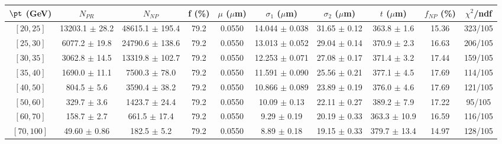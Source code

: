 \begin{tabular}{c||c|c|c|c|c|c|c||c|c}
$\pt$ (GeV) & $N_{PR}$ & $N_{NP}$ & f (\%) & $\mu$ ($\mu$m) & $\sigma_1$ ($\mu$m) & $\sigma_2$ ($\mu$m)  & $t$ ($\mu$m) & $f_{NP}$ (\%) & $\chi^2$/ndf \\
\hline
$[20, 25]$ & 13203.1 $\pm$ 28.2 & 48615.1 $\pm$ 195.4 & 79.2 & 0.0550 & 14.044 $\pm$ 0.038 & 31.65 $\pm$ 0.12 & 363.8 $\pm$ 1.6 & 15.36 & 323/105\\
$[25, 30]$ & 6077.2 $\pm$ 19.8 & 24790.6 $\pm$ 138.6 & 79.2 & 0.0550 & 13.013 $\pm$ 0.052 & 29.04 $\pm$ 0.14 & 370.9 $\pm$ 2.3 & 16.63 & 206/105\\
$[30, 35]$ & 3062.8 $\pm$ 14.5 & 13319.8 $\pm$ 102.7 & 79.2 & 0.0550 & 12.253 $\pm$ 0.071 & 27.08 $\pm$ 0.17 & 371.4 $\pm$ 3.2 & 17.44 & 159/105\\
$[35, 40]$ & 1690.0 $\pm$ 11.1 & 7500.3 $\pm$ 78.0 & 79.2 & 0.0550 & 11.591 $\pm$ 0.090 & 25.56 $\pm$ 0.21 & 377.1 $\pm$ 4.5 & 17.69 & 114/105\\
$[40, 50]$ & 804.5 $\pm$ 5.6 & 3590.4 $\pm$ 38.2 & 79.2 & 0.0550 & 10.866 $\pm$ 0.089 & 23.89 $\pm$ 0.19 & 376.0 $\pm$ 4.6 & 17.69 & 121/105\\
$[50, 60]$ & 329.7 $\pm$ 3.6 & 1423.7 $\pm$ 24.4 & 79.2 & 0.0550 & 10.09 $\pm$ 0.13 & 22.11 $\pm$ 0.27 & 389.2 $\pm$ 7.9 & 17.22 & 95/105\\
$[60, 70]$ & 158.7 $\pm$ 2.7 & 661.5 $\pm$ 17.4 & 79.2 & 0.0550 & 9.29 $\pm$ 0.19 & 20.19 $\pm$ 0.33 & 363.3 $\pm$ 10.9 & 16.59 & 116/105\\
$[70, 100]$ & 49.60 $\pm$ 0.86 & 182.5 $\pm$ 5.2 & 79.2 & 0.0550 & 8.89 $\pm$ 0.18 & 19.15 $\pm$ 0.33 & 379.7 $\pm$ 13.4 & 14.97 & 128/105\\
\end{tabular}
